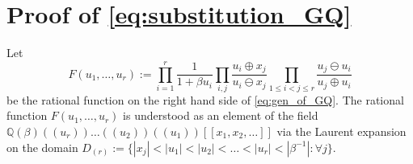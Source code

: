 \documentclass{amsart}
\def\QQ{\mathord{\mathbb{Q}}}
\begin{document}
%

\appendix

\section{Proof of \eqref{eq:substitution_GQ}}

Let
\[
F(u_1,\dots,u_r):=
\prod_{i=1}^r
\frac{1}{1+\beta u_i}
\prod_{i,j}\frac{u_i\oplus x_j}{u_i\ominus x_j}
\prod_{1\leq i<j\leq r}\frac{u_j\ominus u_i}{u_j\oplus u_i}
\]
be the rational function on the right hand side of \eqref{eq:gen_of_GQ}.
The rational function $F(u_1,\dots,u_r)$ is understood as an element of the field $\QQ(\beta)((u_r))\dots ((u_2))((u_1))[[x_1,x_2,\dots]]
$ via the Laurent expansion on the domain $D_{(r)}:=\{|x_j|<|u_1|<|u_2|<\dots<|u_r|<|\beta^{-1}|:\forall j\}$.
\end{document}
